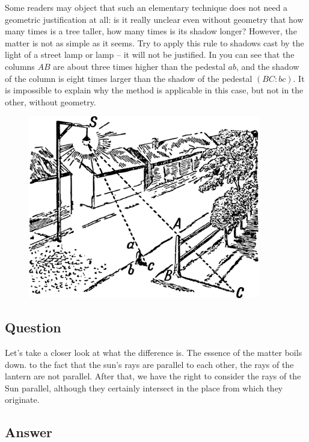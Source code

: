 Some readers may object that such an elementary technique does not need a geometric justification at all: is it really unclear even without geometry that how many times is a tree taller, how many times is its shadow longer? However, the matter is not as simple as it seems. Try to apply this rule to shadows cast by the light of a street lamp or lamp -- it will not be justified. In  you can see that the columns $AB$ are about three times higher than the pedestal $ab$, and the shadow of the column is eight times larger than the shadow of the pedestal $(BC:bc)$. It is impossible to explain why the method is applicable in this case, but not in the other, without geometry.

\begin{figure}[h!]
\centering
\includegraphics[width=0.9\textwidth]{figures/ch-01/fig-01-02.pdf}
\end{figure}

\subsection*{Question}

Let's take a closer look at what the difference is. The essence of the matter boils down. to the fact that the sun's rays are parallel to each other, the rays of the lantern are not parallel. After that, we have the right to consider the rays of the Sun parallel, although they certainly intersect in the place from which they originate.

\subsection*{Answer}

